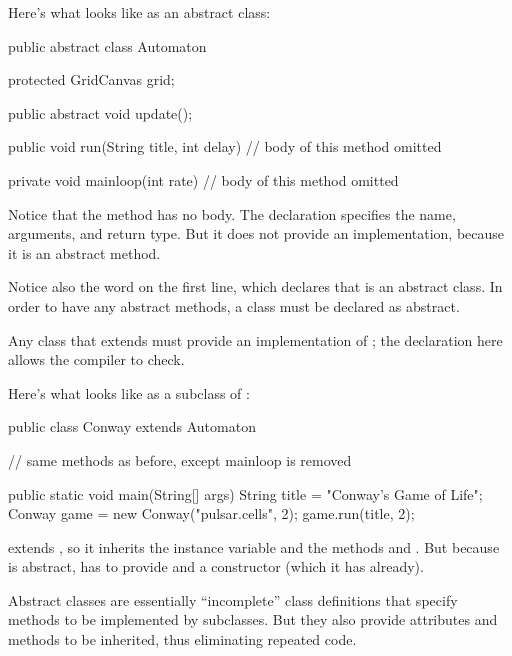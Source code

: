 Here's what  looks like as an abstract class:

\begin{code}
public abstract class Automaton {
    protected GridCanvas grid;

    public abstract void update();

    public void run(String title, int delay) {
        // body of this method omitted
    }

    private void mainloop(int rate) {
        // body of this method omitted
    }
}
\end{code}

Notice that the  method has no body.
The declaration specifies the name, arguments, and return type.
But it does not provide an implementation, because it is an abstract method.

Notice also the word  on the first line, which declares that  is an abstract class.
In order to have any abstract methods, a class must be declared as abstract.

Any class that extends  must provide an implementation of ; the declaration here allows the compiler to check.

Here's what  looks like as a subclass of :

\begin{code}
public class Conway extends Automaton {

    // same methods as before, except mainloop is removed

    public static void main(String[] args) {
        String title = "Conway's Game of Life";
        Conway game = new Conway("pulsar.cells", 2);
        game.run(title, 2);
    }
}
\end{code}

 extends , so it inherits the instance variable  and the methods  and .
But because  is abstract,  has to provide  and a constructor (which it has already).

Abstract classes are essentially ``incomplete'' class definitions that specify methods to be implemented by subclasses.
But they also provide attributes and methods to be inherited, thus eliminating repeated code.



